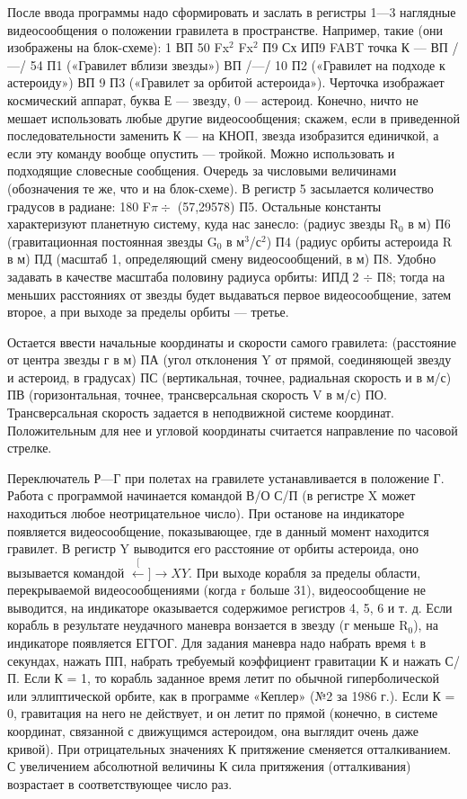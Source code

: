 \documentclass[11pt,a4paper,oneside]{article}
\def\XY{$\stackrel[\leftarrow]{\rightarrow}{XY}$}
\begin{document}
После ввода программы надо сформировать и заслать в регистры 1—3 наглядные видеосообщения о положении гравилета в пространстве. Например, такие (они изображены на блок-схеме): 1 ВП 50 Fx$^{2}$ Fx$^{2}$ П9 Сх ИП9 FABT точка К — ВП /—/ 54 П1 («Гравилет вблизи звезды») ВП /—/ 10 П2 («Гравилет на подходе к астероиду») ВП 9 П3 («Гравилет за орбитой астероида»). Черточка изображает космический аппарат, буква Е — звезду, 0 — астероид. Конечно, ничто не мешает использовать любые другие видеосообщения; скажем, если в приведенной последовательности заменить К — на КНОП, звезда изобразится единичкой, а если эту команду вообще опустить — тройкой. Можно использовать и подходящие словесные сообщения.
Очередь за числовыми величинами (обозначения те же, что и на блок-схеме). В регистр 5 засылается количество градусов в радиане: 180 F$\pi\div$ (57,29578) П5. Остальные константы характеризуют планетную систему, куда нас занесло: (радиус звезды R$_{0}$ в м) П6 (гравитационная постоянная звезды G$_{0}$ в м$^{3}$/с$^{2}$) П4 (радиус орбиты астероида R в м) ПД (масштаб 1, определяющий смену видеосообщений, в м) П8. Удобно задавать в качестве масштаба половину радиуса орбиты: ИПД 2 $\div$ П8; тогда на меньших расстояниях от звезды будет выдаваться первое видеосообщение, затем второе, а при выходе за пределы орбиты — третье.

Остается ввести начальные координаты и скорости самого гравилета: (расстояние от центра звезды г в м) ПА (угол отклонения Y от прямой, соединяющей звезду и астероид, в градусах) ПС (вертикальная, точнее, радиальная скорость и в м/с) ПВ (горизонтальная, точнее, трансверсальная скорость V в м/с) ПО. Трансверсальная скорость задается в неподвижной системе координат. Положительным для нее и угловой координаты считается направление по часовой стрелке.

Переключатель Р—Г при полетах на гравилете устанавливается в положение Г. Работа с программой начинается командой В/О С/П (в регистре X может находиться любое неотрицательное число). При останове на индикаторе появляется видеосообщение, показывающее, где в данный момент находится гравилет. В регистр Y выводится его расстояние от орбиты астероида, оно вызывается командой \XY. При выходе корабля за пределы области, перекрываемой видеосообщениями (когда r больше 31), видеосообщение не выводится, на индикаторе оказывается содержимое регистров 4, 5, 6 и т. д. Если корабль в результате неудачного маневра вонзается в звезду (г меньше R$_{0}$), на индикаторе появляется ЕГГОГ. Для задания маневра надо набрать время t в секундах, нажать ПП, набрать требуемый коэффициент гравитации К и нажать С/П. Если К = 1, то корабль заданное время летит по обычной гиперболической или эллиптической орбите, как в программе «Кеплер» (№2 за 1986 г.). Если К = 0, гравитация на него не действует, и он летит по прямой (конечно, в системе координат, связанной с движущимся астероидом, она выглядит очень даже кривой). При отрицательных значениях К притяжение сменяется отталкиванием. С увеличением абсолютной величины К сила притяжения (отталкивания) возрастает в соответствующее число раз.
\end{document}
